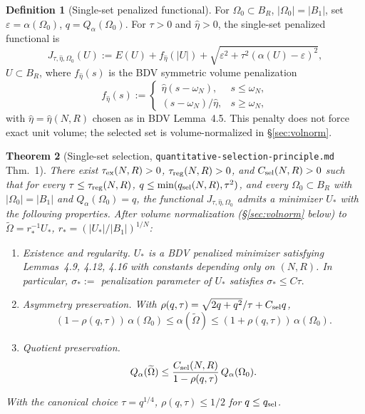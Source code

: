 \documentclass[11pt]{amsart}
\newtheorem{theorem}{Theorem}[section]
\theoremstyle{definition}
\newtheorem{definition}[theorem]{Definition}
\newcommand{\abs}[1]{\left|#1\right|}
\begin{document}
\begin{definition}[Single-set penalized functional]\label{def:penal}
For $\Omega_0\subset B_R$, $\abs{\Omega_0}=\abs{B_1}$, set
$\varepsilon=\alpha(\Omega_0)$, $q=Q_\alpha(\Omega_0)$. For
$\tau>0$ and $\hat\eta>0$, the single-set penalized functional is
\[
J_{\tau,\hat\eta,\Omega_0}(U)
:=E(U)+f_{\hat\eta}(\abs U)
+\sqrt{\varepsilon^2+\tau^2(\alpha(U)-\varepsilon)^2},
\]
$U\subset B_R$, where $f_{\hat\eta}(s)$ is the BDV symmetric volume
penalization
\[
f_{\hat\eta}(s):=
\begin{cases}
\hat\eta(s-\omega_N),&s\le\omega_N,\\
(s-\omega_N)/\hat\eta,&s\ge\omega_N,
\end{cases}
\]
with $\hat\eta=\hat\eta(N,R)$ chosen as in BDV Lemma~4.5. This penalty does
not force exact unit volume; the selected set is volume-normalized in
\S\ref{sec:volnorm}.
\end{definition}

\begin{theorem}[Single-set selection, \texttt{quantitative-selection-principle.md} Thm.~1]\label{thm:selection}
There exist $\tau_{\rm ex}(N,R)>0$, $\tau_{\rm reg}(N,R)>0$, and
$C_{\rm sel}(N,R)>0$ such that for every $\tau\le\tau_{\rm reg}(N,R)$,
$q\le\min(q_{\rm sel}(N,R),\tau^2)$, and every $\Omega_0\subset B_R$ with
$\abs{\Omega_0}=\abs{B_1}$ and $Q_\alpha(\Omega_0)=q$, the functional
$J_{\tau,\hat\eta,\Omega_0}$ admits a minimizer $U_*$ with the following
properties. After volume normalization (\S\ref{sec:volnorm} below) to
$\widetilde\Omega=r_*^{-1}U_*$, $r_*=(\abs{U_*}/\abs{B_1})^{1/N}$:
\begin{enumerate}
\item \emph{Existence and regularity.} $U_*$ is a BDV penalized minimizer
satisfying Lemmas~4.9, 4.12, 4.16 with constants depending only on
$(N,R)$. In particular, $\sigma_*:=$ penalization parameter of $U_*$
satisfies
\(
\sigma_*\le C\tau.
\)
\item \emph{Asymmetry preservation.} With
$\rho(q,\tau)=\sqrt{2q+q^2}/\tau+C_{\rm sel}q$,
\[
(1-\rho(q,\tau))\,\alpha(\Omega_0)
\le \alpha(\widetilde\Omega)
\le (1+\rho(q,\tau))\,\alpha(\Omega_0).
\]
\item \emph{Quotient preservation.}
\[
Q_\alpha(\widetilde\Omega)\le\frac{C_{\rm sel}(N,R)}{1-\rho(q,\tau)}\,Q_\alpha(\Omega_0).
\]
\end{enumerate}
With the canonical choice $\tau=q^{1/4}$, $\rho(q,\tau)\le1/2$ for
$q\le q_{\rm sel}$.
\end{theorem}
\end{document}
